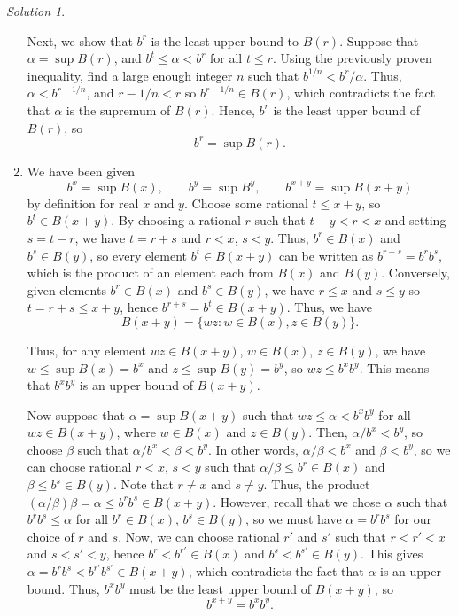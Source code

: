 \documentclass[11pt]{report}
\theoremstyle{remark}
\newtheorem*{solution}{Solution}
\begin{document}
\begin{solution}
\begin{enumerate}
            Next, we show that $b^r$ is the least upper bound to $B(r)$. Suppose
            that $\alpha = \sup B(r)$, and $b^t \leq \alpha < b^r$ for all $t \leq
            r$. Using the previously proven inequality, find a large enough integer
            $n$ such that $b^{1 / n} < b^r / \alpha$. Thus, $\alpha < b^{r - 1 /
            n}$, and $r - 1 / n < r$ so $b^{r - 1 / n} \in B(r)$, which contradicts
            the fact that $\alpha$ is the supremum of $B(r)$. Hence, $b^r$ is the
            least upper bound of $B(r)$, so \[
                b^r = \sup B(r).
            \] 
            \item We have been given \[
                b^x = \sup B(x), \qquad b^y = \sup B^y, \qquad b^{x + y} = \sup B(x + y)
            \] by definition for real $x$ and $y$. Choose some rational $t \leq x +
            y$, so $b^t \in B(x + y)$. By choosing a rational $r$ such that $t - y <
            r < x$ and setting $s = t - r$, we have $t = r + s$ and $r < x$, $s <
            y$. Thus, $b^r \in B(x)$ and $b^s \in B(y)$, so every element $b^t \in
            B(x + y)$ can be written as $b^{r + s} = b^rb^s$, which is the product
            of an element each from $B(x)$ and $B(y)$. Conversely, given elements
            $b^r \in B(x)$ and $b^s \in B(y)$, we have $r \leq x$ and $s \leq y$ so
            $t = r + s \leq x + y$, hence $b^{r + s} = b^t \in B(x + y)$. Thus,
            we have \[
                B(x + y) = \{wz: w\in B(x), z \in B(y)\}.
            \]

            Thus, for any element $wz \in B(x + y)$, $w \in B(x)$, $z \in B(y)$, we
            have $w \leq \sup B(x) = b^x$ and $z \leq \sup B(y) = b^y$, so $wz \leq
            b^x b^y$. This means that $b^xb^y$ is an upper bound of $B(x + y)$.

            Now suppose that $\alpha = \sup B(x + y)$ such that 
            $wz \leq \alpha < b^xb^y$ for all $wz \in B(x + y)$, where $w \in B(x)$
            and $z \in B(y)$. Then, $\alpha / b^x < b^y$, so choose $\beta$ such
            that $\alpha / b^x < \beta < b^y$. In other words, $\alpha / \beta <
            b^x$ and $\beta < b^y$, so we can choose rational $r < x$, $s < y$ such
            that $\alpha / \beta \leq b^r \in B(x)$ and $\beta \leq b^s \in B(y)$.
            Note that $r \neq x$ and $s \neq y$.
            Thus, the product $(\alpha / \beta)\beta = \alpha \leq b^rb^s \in B(x +
            y)$. However, recall that we chose $\alpha$ such that $b^rb^s \leq \alpha$
            for all $b^r \in B(x)$, $b^s \in B(y)$, so we must have $\alpha =
            b^rb^s$ for our choice of $r$ and $s$. Now, we can choose rational $r'$ and 
            $s'$ such that $r < r' < x$ and $s < s' < y$, hence $b^r < b^{r'} \in
            B(x)$ and $b^s < b^{s'} \in B(y)$. This gives $\alpha = b^rb^s <
            b^{r'}b^{s'} \in B(x + y)$, which contradicts the fact that $\alpha$ is
            an upper bound. Thus, $b^xb^y$ must be the least upper bound of $B(x +
            y)$, so \[
                b^{x + y} = b^xb^y.
            \] 
        \end{enumerate}
    \end{solution}
    
\end{document}
